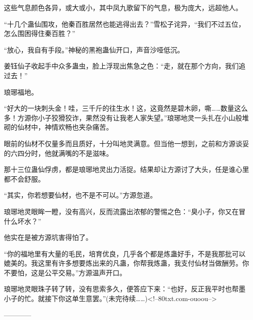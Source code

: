 \begin{this_body}
这些气息颜色各异，或大或小，其中凤九歌留下的气息，极为庞大，远超他人。

“十几个蛊仙围攻，他秦百胜居然也能逃得出去？”雪松子诧异，“我们不过五位，怎么围困得住秦百胜？”

“放心，我自有手段。”神秘的黑袍蛊仙开口，声音沙哑低沉。

姜钰仙子收起手中众多蛊虫，脸上浮现出焦急之色：“走，就在那个方向，我们追过去！”

琅琊福地。

“好大的一块刺头金！哇，三千斤的往生水！这，这竟然是碧木卵，嘶……数量这么多！方源你小子狡猾狡诈，果然没有让我老人家失望。”琅琊地灵一头扎在小山般堆砌的仙材中，神情欢畅也夹杂痛苦。

眼前的仙材不仅量多而且质好，十分叫地灵满意。但当他一想到，之前和方源谈妥的六四分时，他就满嘴的不是滋味。

那十三位蛊仙俘虏，都是琅琊地灵出力活捉。结果却让方源讨了大头，任是谁心里都不会舒服。

“其实，你若想要仙材，也不是不可以。”方源忽道。

琅琊地灵眼眸一瞪，没有高兴，反而流露出浓郁的警惕之色：“臭小子，你又在冒什么坏水？”

他实在是被方源坑害得怕了。

“你的福地里有大量的毛民，培育优良，几乎各个都是炼蛊好手，不是我那批可以媲美的。我这里有许多想要炼出来的凡蛊，你帮我炼蛊，我支付仙材当做酬劳。你不要怕，这是公平交易。”方源温声开口。

琅琊地灵眼珠子转了转，没有思索多久，便答应下来：“也好，反正我平时也帮墨小子的忙。就接下你这单生意罢。”(未完待续……)<!--80txt.com-ouoou-->

------------

\end{this_body}

